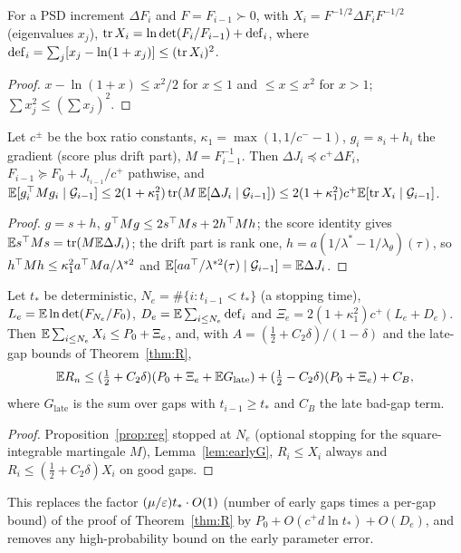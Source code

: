\begin{lemma}\label{lem:defect}\Pt{}
For a PSD increment $\Delta F_i$ and $F=F_{i-1}\succ0$, with $X_i=F^{-1/2}\Delta F_iF^{-1/2}$ (eigenvalues $x_j$),
$\operatorname{tr} X_i=\ln\det(F_i/F_{i-1})+\mathrm{def}_i$, where $\mathrm{def}_i=\sum_j[x_j-\ln(1+x_j)]\le(\operatorname{tr} X_i)^2$.
\end{lemma}
\begin{proof}
$x-\ln(1+x)\le x^2/2$ for $x\le1$ and $\le x\le x^2$ for $x>1$; $\sum x_j^2\le(\sum x_j)^2$.
\end{proof}

\begin{lemma}\label{lem:earlyG}\Pt{}
Let $c^\pm$ be the box ratio constants, $\kappa_1=\max(1,1/c^--1)$, $g_i=s_i+h_i$ the gradient (score plus drift part), $M=F_{i-1}^{-1}$. Then $\Delta J_i\preceq c^+\Delta F_i$, $F_{i-1}\succeq F_0+J_{t_{i-1}}/c^+$ pathwise, and
$\mathbb{E}[g_i^{\top} Mg_i\mid\mathcal G_{i-1}]\le2(1+\kappa_1^2)\operatorname{tr}(M\,\mathbb{E}[\Delta J_i\mid\mathcal G_{i-1}])\le2(1+\kappa_1^2)c^+\mathbb{E}[\operatorname{tr} X_i\mid\mathcal G_{i-1}]$.
\end{lemma}
\begin{proof}
$g=s+h$, $g^{\top} Mg\le2s^{\top} Ms+2h^{\top} Mh$; the score identity gives $\mathbb{E} s^{\top} Ms=\operatorname{tr}(M\mathbb{E}\Delta J_i)$; the drift part is rank one, $h=a(1/\lambda^*-1/\lambda_\theta)(\tau)$, so $h^{\top} Mh\le\kappa_1^2a^{\top} Ma/\lambda^{*2}$ and $\mathbb{E}[aa^{\top}/\lambda^{*2}(\tau)\mid\mathcal G_{i-1}]=\mathbb{E}\Delta J_i$.
\end{proof}

\begin{proposition}\label{prop:Rdecomp}\Pt{}
Let $t_*$ be deterministic, $N_e=\#\{i:t_{i-1}<t_*\}$ (a stopping time), $L_e=\mathbb{E}\ln\det(F_{N_e}/F_0)$, $D_e=\mathbb{E}\sum_{i\le N_e}\mathrm{def}_i$ and $\Xi_e=2(1+\kappa_1^2)c^+(L_e+D_e)$. Then $\mathbb{E}\sum_{i\le N_e}X_i\le P_0+\Xi_e$, and, with $A=(\tfrac12+C_2\delta)/(1-\delta)$ and the late-gap bounds of Theorem~\ref{thm:R},
\[
\mathbb{E} R_n\le(\tfrac12+C_2\delta)(P_0+\Xi_e+\mathbb{E} G_{\mathrm{late}})+(\tfrac12-C_2\delta)(P_0+\Xi_e)+C_B,
\]
where $G_{\mathrm{late}}$ is the sum over gaps with $t_{i-1}\ge t_*$ and $C_B$ the late bad-gap term.
\end{proposition}
\begin{proof}
Proposition~\ref{prop:reg} stopped at $N_e$ (optional stopping for the square-integrable martingale $M$), Lemma~\ref{lem:earlyG}, $R_i\le X_i$ always and $R_i\le(\tfrac12+C_2\delta)X_i$ on good gaps.
\end{proof}
This replaces the factor $(\mu/\varepsilon)t_*\cdot O(1)$ (number of early gaps times a per-gap bound) of the proof of Theorem~\ref{thm:R} by $P_0+O(c^+d\ln t_*)+O(D_e)$, and removes any high-probability bound on the early parameter error.

